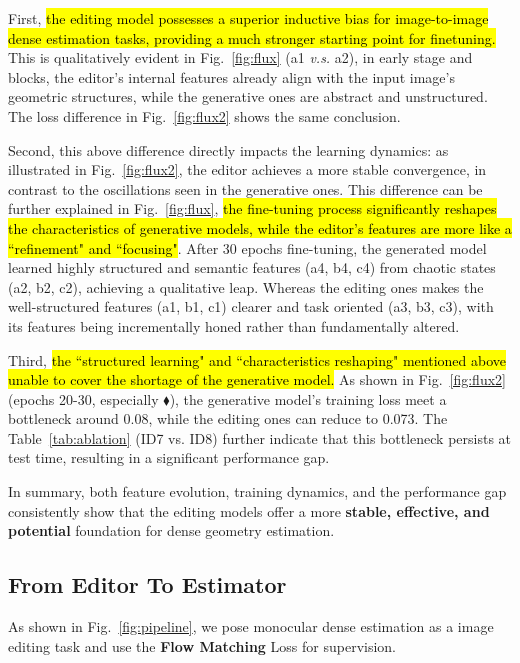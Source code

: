 \documentclass{article} %
\begin{document}
First, \hl{the editing model possesses a superior inductive bias for image-to-image dense estimation tasks, providing a much stronger starting point for finetuning.} This is qualitatively evident in Fig.~\ref{fig:flux} (a1 \textit{v.s.} a2), in early stage and blocks, the editor’s internal features already align with the input image's geometric structures, while the generative ones are abstract and unstructured.  The loss difference in Fig.~\ref{fig:flux2}  shows the same conclusion.

Second, this above difference directly impacts the learning dynamics: as illustrated in Fig.~\ref{fig:flux2}, the editor achieves a more stable convergence, in contrast to the oscillations seen in the generative ones. This difference can be further explained in Fig.~\ref{fig:flux}, \hl{the fine-tuning process significantly reshapes the characteristics of generative models, while the editor's features are more like a ``refinement" and ``focusing"}. After 30 epochs fine-tuning, the generated model learned highly structured and semantic features (a4, b4, c4) from chaotic states (a2, b2, c2), achieving a qualitative leap. Whereas the editing ones makes the well-structured features (a1, b1, c1) clearer and task oriented (a3, b3, c3), with its features being incrementally honed rather than fundamentally altered.

Third, \hl{the ``structured learning" and ``characteristics reshaping" mentioned above  unable to cover the shortage of the generative model.} As shown in Fig.~\ref{fig:flux2} (epochs 20-30, especially $\blacklozenge$), the generative model's training loss meet a bottleneck around 0.08, while the editing ones can reduce to 0.073. The Table~\ref{tab:ablation} (ID7 vs. ID8) further indicate that this bottleneck persists at test time, resulting in a significant performance gap.

In summary, both feature evolution, training dynamics, and the performance gap consistently show that the editing models offer a more \textbf{stable, effective, and potential} foundation for dense geometry estimation.
\subsection{From Editor To Estimator}
\label{sec:preliminaries}

As shown in Fig.~\ref{fig:pipeline}, we pose monocular dense estimation as a image editing task and use the \textbf{Flow Matching} Loss for supervision. 
\end{document}
